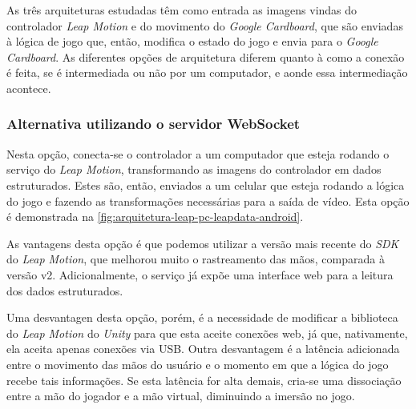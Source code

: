 As três arquiteturas estudadas têm como entrada as imagens vindas do controlador \textit{Leap Motion} e do movimento do \textit{Google Cardboard}, que são enviadas à lógica de jogo que, então, modifica o estado do jogo e envia para o \textit{Google Cardboard}. As diferentes opções de arquitetura diferem quanto à como a conexão é feita, se é intermediada ou não por um computador, e aonde essa intermediação acontece.

\subsubsection{Alternativa utilizando o servidor WebSocket}\label{subsubsec-arquiteturas-leapmotion-pc-leapdata-android}

Nesta opção, conecta-se o controlador a um computador que esteja rodando o serviço do \textit{Leap Motion}, transformando as imagens do controlador em dados estruturados. Estes são, então, enviados a um celular que esteja rodando a lógica do jogo e fazendo as transformações necessárias para a saída de vídeo. Esta opção é demonstrada na \autoref{fig:arquitetura-leap-pc-leapdata-android}.

As vantagens desta opção é que podemos utilizar a versão mais recente do \textit{SDK} do \textit{Leap Motion}, que melhorou muito o rastreamento das mãos, comparada à versão v2. Adicionalmente, o serviço já expõe uma interface web para a leitura dos dados estruturados. 

Uma desvantagen desta opção, porém, é a necessidade de modificar a biblioteca do \textit{Leap Motion} do \textit{Unity} para que esta aceite conexões web, já que, nativamente, ela aceita apenas conexões via USB. Outra desvantagem é a latência adicionada entre o movimento das mãos do usuário e o momento em que a lógica do jogo recebe tais informações. Se esta latência for alta demais, cria-se uma dissociação entre a mão do jogador e a mão virtual, diminuindo a imersão no jogo.

